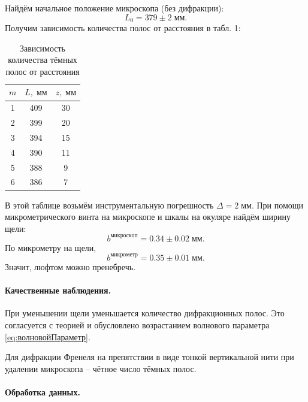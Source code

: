 \documentclass[a4paper]{article}
\begin{document}
Найдём начальное положение микроскопа (без дифракции):
\begin{equation*}\label{key}
	L_0 = 379 \pm 2\; мм.
\end{equation*}
Получим зависимость количества полос от расстояния в табл. 1: 
\begin{table}[h]
	\centering
	\begin{tabular}{|c|c|c|}
		\hline
		$m$ & $L, \; мм$ & $ z, \; мм $\\
		\hline
		1 & 409 & 30 \\
		\hline
		2 & 399 & 20 \\
		\hline
		3 & 394 & 15 \\
		\hline
		4 & 390 & 11 \\
		\hline
		5 & 388 & 9 \\
		\hline
		6 & 386 & 7 \\
		\hline
	\end{tabular}
	\label{tab:Френель}
	\caption{Зависимость количества тёмных полос от расстояния}
\end{table}
В этой таблице возьмём инструментальную погрешность $ \Delta = 2 \; мм $.
При помощи микрометрического винта на микроскопе и шкалы на окуляре найдём ширину щели:
\begin{equation*}\label{key}
	b^{микроскоп} = 0.34\pm 0.02 \; мм.
\end{equation*}
По микрометру на щели,
\begin{equation*}\label{key}
	b^{микрометр} = 0.35\pm 0.01 \; мм.
\end{equation*}
Значит, люфтом можно пренебречь.

\paragraph{Качественные наблюдения.}

При уменьшении щели уменьшается количество дифракционных полос. Это согласуется с теорией и обусловлено возрастанием волнового параметра \eqref{eq:волновойПараметр}.

Для дифракции Френеля на препятствии в виде тонкой вертикальной нити при удалении микроскопа -- чётное число тёмных полос.

\paragraph{Обработка данных.}
\end{document}
